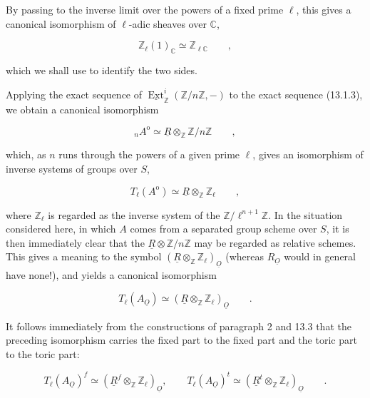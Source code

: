 \noindent
By passing to the inverse limit over the powers of a fixed prime
$\ell$, this gives a canonical isomorphism of $\ell$-adic sheaves over
$\mathbb C$,

\begin{equation*}
 \mathbb Z_\ell(1)_{\mathbb C}\simeq\mathbb Z_{\ell\mathbb C}
 \qquad ,
\end{equation*}

\noindent
which we shall use to identify the two sides.

Applying the exact sequence of
$\underline{\operatorname{Ext}}^i_{\mathbb Z}
(\mathbb Z/n\mathbb Z,-)$ to the exact sequence (13.1.3), we obtain a
canonical isomorphism

\begin{equation}\tag{13.5.5}
 {}_nA^{\mathrm o}\simeq
 \underline R\otimes_{\mathbb Z}\mathbb Z/n\mathbb Z
 \qquad ,
\end{equation}

\noindent
which, as $n$ runs through the powers of a given prime $\ell$, gives an
isomorphism of inverse systems of groups over $S$,

\begin{equation}\tag{13.5.6}
 T_\ell(A^{\mathrm o})\simeq
 \underline R\otimes_{\mathbb Z}\mathbb Z_\ell
 \qquad ,
\end{equation}

\noindent
where $\mathbb Z_\ell$ is regarded as the inverse system of the
$\mathbb Z/\ell^{n+1}\mathbb Z$.  In the situation considered here, in
which $A$ comes from a separated group scheme over $S$, it is then
immediately clear that the
$\underline R\otimes\mathbb Z/n\mathbb Z$ may be regarded as relative
schemes.  This gives a meaning to the symbol
$(\underline R\otimes_{\mathbb Z}\mathbb Z_\ell)_{\underline O}$
(whereas $R_{\underline O}$ would in general have none!), and yields a
canonical isomorphism

\begin{equation}\tag{13.5.7}
 T_\ell(A_{\underline O})\simeq
 (\underline R\otimes_{\mathbb Z}\mathbb Z_\ell)_{\underline O}
 \qquad .
\end{equation}

\noindent
It follows immediately from the constructions of paragraph 2 and 13.3
that the preceding isomorphism carries the fixed part to the fixed part
and the toric part to the toric part:

\begin{equation}\tag{13.5.8}
 T_\ell(A_{\underline O})^f\simeq
 (\underline R^f\otimes_{\mathbb Z}\mathbb Z_\ell)_{\underline O},
 \qquad
 T_\ell(A_{\underline O})^t\simeq
 (\underline R^t\otimes_{\mathbb Z}\mathbb Z_\ell)_{\underline O}
 \qquad .
\end{equation}

